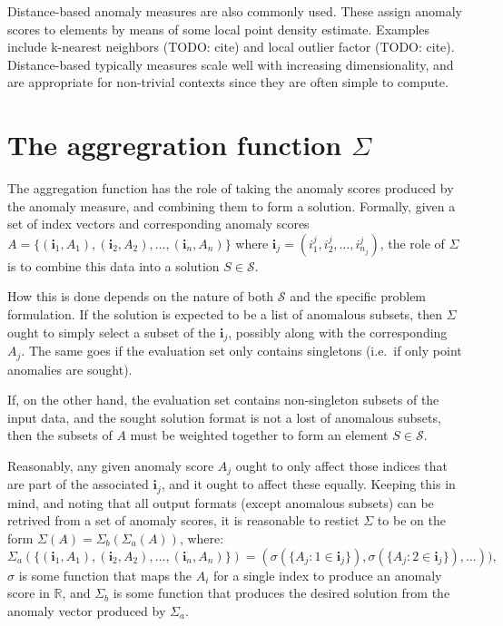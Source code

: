 Distance-based anomaly measures are also commonly used. These assign anomaly scores to elements by means of some local point density estimate. Examples include k-nearest neighbors (TODO: cite) and local outlier factor (TODO: cite). Distance-based typically measures scale well with increasing dimensionality, and are appropriate for non-trivial contexts since they are often simple to compute.

\section{The aggregration function $\Sigma$}

The aggregation function has the role of taking the anomaly scores produced by the anomaly measure, and combining them to form a solution. Formally, given a set of index vectors and corresponding anomaly scores $A = \{ (\mathbf{i}_1, A_1), (\mathbf{i}_2, A_2), \dots, (\mathbf{i}_n, A_n) \}$ where $\mathbf{i}_j = (i_1^j, i_2^j, \dots, i_{n_j}^j)$, the role of $\Sigma$ is to combine this data into a solution $S \in \mathcal{S}$.

How this is done depends on the nature of both $\mathcal{S}$ and the specific problem formulation. If the solution is expected to be a list of anomalous subsets, then $\Sigma$ ought to simply select a subset of the $\mathbf{i}_j$, possibly along with the corresponding $A_j$. The same goes if the evaluation set only contains singletons (i.e.\ if only point anomalies are sought).

If, on the other hand, the evaluation set contains non-singleton subsets of the input data, and the sought solution format is not a lost of anomalous subsets, then the subsets of $A$ must be weighted together to form an element $S \in \mathcal{S}$.

Reasonably, any given anomaly score $A_j$ ought to only affect those indices that are part of the associated $\mathbf{i}_j$, and it ought to affect these equally. Keeping this in mind, and noting that all output formats (except anomalous subsets) can be retrived from a set of anomaly scores, it is reasonable to restict $\Sigma$ to be on the form $\Sigma(A) = \Sigma_b(\Sigma_a(A))$, where:
\[
    \Sigma_a(\{ (\mathbf{i}_1, A_1), (\mathbf{i}_2, A_2), \dots, (\mathbf{i}_n, A_n) \}) = (\sigma(\{A_j: 1 \in \mathbf{i}_j\}), \sigma(\{A_j: 2 \in \mathbf{i}_j\}), \dots)),
\]
$\sigma$ is some function that maps the $A_i$ for a single index to produce an anomaly score in $\mathbb{R}$, and $\Sigma_b$ is some function that produces the desired solution from the anomaly vector produced by $\Sigma_a$.

